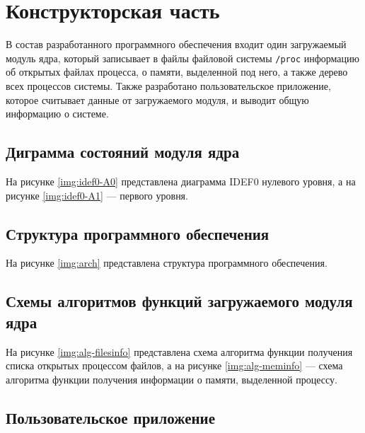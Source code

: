 \chapter{Конструкторская часть}

В состав разработанного программного обеспечения входит один загружаемый модуль ядра, который записывает в файлы файловой системы \texttt{/proc} информацию об открытых файлах процесса, о памяти, выделенной под него, а также дерево всех процессов системы. Также разработано пользовательское приложение, которое считывает данные от загружаемого модуля, и выводит общую информацию о системе.


\section{Диграмма состояний модуля ядра}

На рисунке \ref{img:idef0-A0} представлена диаграмма IDEF0 нулевого уровня, а на рисунке \ref{img:idef0-A1} --- первого уровня.



\section{Структура программного обеспечения}

На рисунке \ref{img:arch} представлена структура программного обеспечения.



\section{Схемы алгоритмов функций загружаемого модуля ядра}

На рисунке \ref{img:alg-filesinfo} представлена схема алгоритма функции получения списка открытых процессом файлов, а на рисунке \ref{img:alg-meminfo} --- схема алгоритма функции получения информации о памяти, выделенной процессу.



\section{Пользовательское приложение} 

